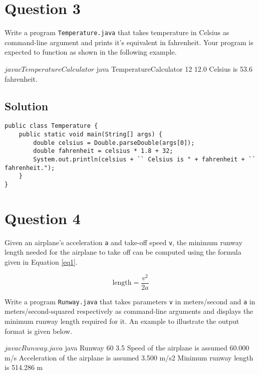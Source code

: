 \documentclass[12pt,letterpaper,twoside]{article}
\begin{document}
\section*{Question 3}

Write a program \texttt{Temperature.java} that takes temperature in Celsius as command-line argument and prints it's equivalent in fahrenheit. Your program is expected to function as shown in the following example.

\begin{terminal}
$ javac TemperatureCalculator
$ java TemperatureCalculator 12
12.0 Celsius is 53.6 fahrenheit.
\end{terminal}

\subsection*{Solution}

\lstset{language=Java,tabsize=2}
\begin{lstlisting}
public class Temperature {
	public static void main(String[] args) {
		double celsius = Double.parseDouble(args[0]);
		double fahrenheit = celsius * 1.8 + 32;
		System.out.println(celsius + `` Celsius is " + fahrenheit + `` fahrenheit.");
	}
}
\end{lstlisting}

\section*{Question 4}

Given an airplane's acceleration \texttt{a} and take-off speed \texttt{v}, the minimum runway length needed for the airplane to take off can be computed using the formula given in Equation \ref{eq1}.

\begin{equation}
\textrm{length} = \frac{v^2}{2a}
\label{eq1}
\end{equation}

Write a program \texttt{Runway.java} that takes parameters \texttt{v} in meters/second and \texttt{a} in meters/second-squared respectively as command-line arguments and displays the minimum runway length required for it. An example to illustrate the output format is given below.

\begin{terminal}
$ javac Runway.java
$ java Runway 60 3.5
Speed of the airplane is assumed 60.000 m/s
Acceleration of the airplane is assumed 3.500 m/s2
Minimum runway length is 514.286 m
\end{terminal}
\end{document}
